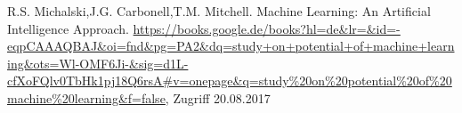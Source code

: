 	
	
	
	
	
	
%	
\begin{thebibliography}{999}
 R.S. Michalski,J.G. Carbonell,T.M. Mitchell. 
 Machine Learning: An Artificial Intelligence Approach. 
 \url{https://books.google.de/books?hl=de&lr=&id=-eqpCAAAQBAJ&oi=fnd&pg=PA2&dq=study+on+potential+of+machine+learning&ots=Wl-OMF6Ji-&sig=d1L-cfXoFQlv0TbHk1pj18Q6rsA#v=onepage&q=study\%20on\%20potential\%20of\%20machine\%20learning&f=false}, Zugriff 20.08.2017

\end{thebibliography}


	

